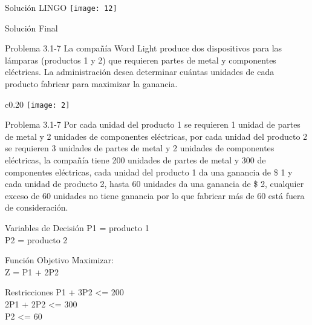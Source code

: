 \documentclass{beamer}
\begin{document}
\begin{frame}[fragile]{Solución LINGO}
    \texttt{[image: 12]}
\end{frame}

\begin{frame}[fragile]{Solución Final}
\end{frame}

\begin{frame}[t,fragile]{Problema 3.1-7 }
La compañía Word Light produce dos dispositivos para las lámparas (productos 1 y 2) que requieren partes de metal y componentes eléctricas. La administración desea determinar cuántas unidades de cada producto fabricar para maximizar la ganancia. 
\begin{wrapfigure}{c}{0.20\textwidth}
    \centering
    \texttt{[image: 2]}
\end{wrapfigure}
\end{frame}
\begin{frame}[t,fragile]{Problema 3.1-7 }
Por cada unidad del producto 1 se requieren 1 unidad de partes de metal y 2 unidades de componentes eléctricas, por cada unidad del producto 2 se requieren 3 unidades de partes de metal y 2 unidades de componentes eléctricas, la compañía tiene 200 unidades de partes de metal y 300 de componentes eléctricas, cada unidad del producto 1 da una ganancia de \$ 1 y cada unidad de producto 2, hasta 60 unidades da una ganancia de \$ 2, cualquier exceso de 60 unidades no tiene ganancia por lo que fabricar más de 60 está fuera de consideración. \\
\end{frame}

\begin{frame}[fragile]{Variables de Decisión}
P1 = producto 1\\
P2 = producto 2

\end{frame}

\begin{frame}[fragile]{Función Objetivo}
Maximizar:\\
Z = P1 + 2P2

\end{frame}

\begin{frame}[fragile]{Restricciones}
P1 + 3P2  <= 200\\
2P1 + 2P2 <= 300\\
P2 <= 60\\

\end{frame}
\end{document}

